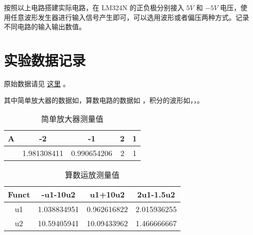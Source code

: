\documentclass[lang=cn,11pt,a4paper,cite=authoryear]{elegantpaper}
\begin{document}








按照以上电路搭建实际电路，在 LM324N 的正负极分别接入 \(5 V\) 和 \(-5 V\) 电压，使用任意波形发生器进行输入信号产生即可，可以选用波形或者偏压两种方式。记录不同电路的输入输出数值。

\section{实验数据记录}

原始数据请见 \href{https://github.com/PannenetsF/Mirco-Electronic-Device-Experiment/tree/main/homework/hw14}{这里} 。

其中简单放大器的数据如，算数电路的数据如 ，积分的波形如，，。

\begin{table}[htb]
    \centering
    \caption{简单放大器测量值}
    \label{t1}
    \begin{tabular}{|c|c|c|c|c|}
    \hline
    A & -2          & -1          & 2 & 1 \\ \hline
      & 1.981308411 & 0.990654206 & 2 & 1 \\ \hline
    \end{tabular}
\end{table}

\begin{table}[htb]
    \centering
    \caption{算数运放测量值}
    \label{t2}
    \begin{tabular}{|c|c|c|c|}
    \hline
    Funct & -u1-10u2    & u1+10u2     & 2u1-1.5u2   \\ \hline
    u1    & 1.038834951 & 0.962616822 & 2.015936255 \\ \hline
    u2    & 10.59405941 & 10.09433962 & 1.466666667 \\ \hline
    \end{tabular}
\end{table}

\end{document}
